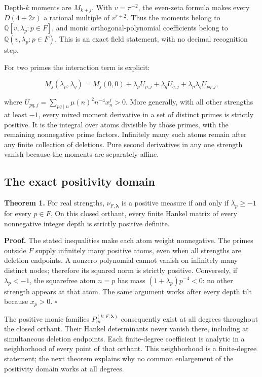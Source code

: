 Depth-\(k\) moments are \(M_{k+j}\). With \(v=\pi^{-2}\), the even-zeta
formula makes every \(D(4+2r)\) a rational multiple of \(v^{r+2}\). Thus
the moments belong to \(\mathbb Q[v,\lambda_p:p\in F]\), and monic
orthogonal-polynomial coefficients belong to
\(\mathbb Q(v,\lambda_p:p\in F)\). This is an exact field statement,
with no decimal recognition step.

For two primes the interaction term is explicit:

\[
M_j(\lambda_p,\lambda_q)=M_j(0,0)+\lambda_p U_{p,j}
+\lambda_q U_{q,j}+\lambda_p\lambda_q U_{pq,j},
\]

where \(U_{pq,j}=\sum_{pq\mid n}\mu(n)^2n^{-4}x_n^j>0\). More generally,
with all other strengths at least \(-1\), every mixed moment derivative
in a set of distinct primes is strictly positive. It is the integral
over atoms divisible by those primes, with the remaining nonnegative
prime factors. Infinitely many such atoms remain after any finite
collection of deletions. Pure second derivatives in any one strength
vanish because the moments are separately affine.

\hypertarget{the-exact-positivity-domain}{%
\subsection{The exact positivity
domain}\label{the-exact-positivity-domain}}

\textbf{Theorem 1.} For real strengths, \(\nu_{F,\boldsymbol\lambda}\)
is a positive measure if and only if \(\lambda_p\ge-1\) for every
\(p\in F\). On this closed orthant, every finite Hankel matrix of every
nonnegative integer depth is strictly positive definite.

\textbf{Proof.} The stated inequalities make each atom weight
nonnegative. The primes outside \(F\) supply infinitely many positive
atoms, even when all strengths are deletion endpoints. A nonzero
polynomial cannot vanish on infinitely many distinct nodes; therefore
its squared norm is strictly positive. Conversely, if \(\lambda_p<-1\),
the squarefree atom \(n=p\) has mass \((1+\lambda_p)p^{-4}<0\): no other
strength appears at that atom. The same argument works after every depth
tilt because \(x_p>0\). \(\square\)

The positive monic families \(P_m^{(k;F,\boldsymbol\lambda)}\)
consequently exist at all degrees throughout the closed orthant. Their
Hankel determinants never vanish there, including at simultaneous
deletion endpoints. Each finite-degree coefficient is analytic in a
neighborhood of every point of that orthant. This neighborhood is a
finite-degree statement; the next theorem explains why no common
enlargement of the positivity domain works at all degrees.

